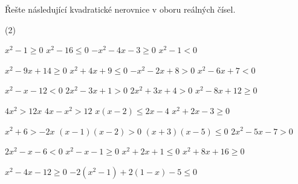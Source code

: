 \documentclass[12pt,a4paper]{article}
\begin{document}
\begin{exercise}
Řešte následující kvadratické nerovnice v oboru reálných čísel.

\begin{tasks}(2)

  \task \(x^2 - 1 \ge 0\)
  \task \(x^2 - 16 \le 0\)
  \task \(-x^2 - 4x - 3 \ge 0\)
  \task \(x^2 - 1 < 0\)

  \task \(x^2 - 9x + 14 \ge 0\)
  \task \(x^2 + 4x + 9 \le 0\)
  \task \(-x^2 - 2x + 8 > 0\)
  \task \(x^2 - 6x + 7 < 0\)

  \task \(x^2 - x - 12 < 0\)
  \task \(2x^2 - 3x + 1 > 0\)
  \task \(2x^2 + 3x + 4 > 0\)
  \task \(x^2 - 8x + 12 \ge 0\)

  \task \(4x^2 > 12x\)
  \task \(4x - x^2 > 12\)
  \task \(x(x - 2) \le 2x - 4\)
  \task \(x^2 + 2x - 3 \ge 0\)

  \task \(x^2 + 6 > -2x\)
  \task \((x - 1)(x - 2) > 0\)
  \task \((x + 3)(x - 5) \le 0\)
  \task \(2x^2 - 5x - 7 > 0\)

  \task \(2x^2 - x - 6 < 0\)
  \task \(x^2 - x - 1 \ge 0\)
  \task \(x^2 + 2x + 1 \le 0\)
  \task \(x^2 + 8x + 16 \ge 0\)

  \task \(x^2 - 4x - 12 \ge 0\)
  \task \(-2(x^2 - 1) + 2(1 - x) - 5 \le 0\)

\end{tasks}

\end{exercise}
\end{document}
